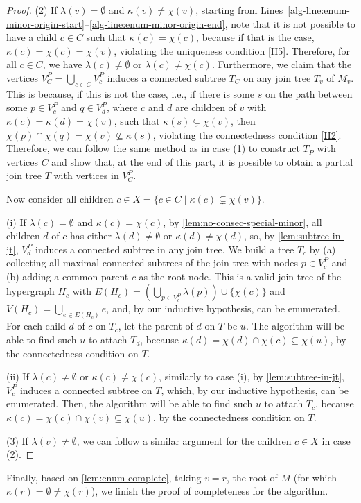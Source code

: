 \begin{proof}
    (2) If $\lambda(v) = \emptyset$ and $\kappa(v) \neq \chi(v)$, starting from Lines~\ref{alg-line:enum-minor-origin-start}--\ref{alg-line:enum-minor-origin-end}, note that it is not possible to have a child $c \in C$ such that $\kappa(c) = \chi(c)$, because if that is the case, $\kappa(c) = \chi(c) = \chi(v)$, violating the uniqueness condition \ref{H5}. Therefore, for all $c \in C$, we have $\lambda(c) \neq \emptyset$ or $\lambda(c) \neq \chi(c)$.
    Furthermore, we claim that the vertices $V_C^P = \bigcup_{c \in C} V_c^P$ induces a connected subtree $T_C$ on any join tree $T_v$ of $M_v$. This is because, if this is not the case, i.e., if there is some $s$ on the path between some $p \in V_c^P$ and $q \in V_d^P$, where $c$ and $d$ are children of $v$ with $\kappa(c) = \kappa(d) = \chi(v)$, such that $\kappa(s) \subsetneq \chi(v)$, then $\chi(p) \cap \chi(q) = \chi(v) \not\subseteq \kappa(s)$, violating the connectedness condition \ref{H2}.
    Therefore, we can follow the same method as in case (1) to construct $T_P$ with vertices $C$ and show that, at the end of this part, it is possible to obtain a partial join tree $T$ with vertices in $V_C^P$.
    
    Now consider all children $c \in X = \{ c \in C \mid \kappa(c) \subsetneq \chi(v) \}$.

    (i) If $\lambda(c) = \emptyset$ and $\kappa(c) = \chi(c)$, by \cref{lem:no-consec-special-minor}, all children $d$ of $c$ has either $\lambda(d) \neq \emptyset$ or $\kappa(d) \neq \chi(d)$, so, by \cref{lem:subtree-in-jt}, $V_d^P$ induces a connected subtree in any join tree. We build a tree $T_c$ by (a) collecting all maximal connected subtrees of the join tree with nodes $p \in V_c^P$ and (b) adding a common parent $c$ as the root node. This is a valid join tree of the hypergraph $H_c$ with $E(H_c) = \left( \bigcup_{p \in V_c^P} \lambda(p) \right) \cup \{ \chi(c) \}$ and $V(H_c) = \bigcup_{e \in E(H_c)} e$, and, by our inductive hypothesis, can be enumerated. For each child $d$ of $c$ on $T_c$, let the parent of $d$ on $T$ be $u$. The algorithm will be able to find such $u$ to attach $T_d$, because $\kappa(d) = \chi(d) \cap \chi(c) \subseteq \chi(u)$, by the connectedness condition on $T$.

    (ii) If $\lambda(c) \neq \emptyset$ or $\kappa(c) \neq \chi(c)$, similarly to case (i), by \cref{lem:subtree-in-jt}, $V_c^P$ induces a connected subtree on $T$, which, by our inductive hypothesis, can be enumerated. Then, the algorithm will be able to find such $u$ to attach $T_c$, because $\kappa(c) = \chi(c) \cap \chi(v) \subseteq \chi(u)$, by the connectedness condition on $T$.

    (3) If $\lambda(v) \neq \emptyset$, we can follow a similar argument for the children $c \in X$ in case (2).
\end{proof}

Finally, based on \cref{lem:enum-complete}, taking $v = r$, the root of $M$ (for which $\kappa(r) = \emptyset \neq \chi(r)$), we finish the proof of completeness for the algorithm.
\vfill
